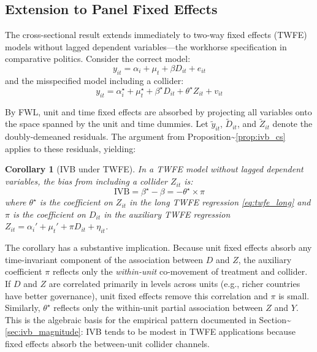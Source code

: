 \documentclass[
]{article}
\newtheorem{corollary}{Corollary}
\begin{document}
\subsection{\texorpdfstring{Extension to Panel Fixed Effects
\label{sec:twfe}}{Extension to Panel Fixed Effects }}\label{extension-to-panel-fixed-effects}

The cross-sectional result extends immediately to two-way fixed effects
(TWFE) models without lagged dependent variables---the workhorse
specification in comparative politics. Consider the correct model:
\begin{equation}
y_{it} = \alpha_i + \mu_t + \beta D_{it} + e_{it}
\label{eq:twfe_short}
\end{equation} and the misspecified model including a collider:
\begin{equation}
y_{it} = \alpha_i^{\star} + \mu_t^{\star} + \beta^{\star} D_{it} + \theta^{\star} Z_{it} + v_{it}
\label{eq:twfe_long}
\end{equation}

By FWL, unit and time fixed effects are absorbed by projecting all
variables onto the space spanned by the unit and time dummies. Let
\(\widetilde{y}_{it}\), \(\widetilde{D}_{it}\), and
\(\widetilde{Z}_{it}\) denote the doubly-demeaned residuals. The
argument from Proposition\textasciitilde{}\ref{prop:ivb_cs} applies to
these residuals, yielding:

\begin{corollary}[IVB under TWFE]
\label{cor:ivb_twfe}
In a TWFE model without lagged dependent variables, the bias from including a collider $Z_{it}$ is:
\begin{equation}
\text{IVB} = \beta^{\star} - \beta = -\theta^{\star} \times \pi
\label{eq:ivb_twfe}
\end{equation}
where $\theta^{\star}$ is the coefficient on $Z_{it}$ in the long TWFE regression \eqref{eq:twfe_long} and $\pi$ is the coefficient on $D_{it}$ in the auxiliary TWFE regression $Z_{it} = \alpha_i' + \mu_t' + \pi D_{it} + \eta_{it}$.
\end{corollary}

The corollary has a substantive implication. Because unit fixed effects
absorb any time-invariant component of the association between \(D\) and
\(Z\), the auxiliary coefficient \(\pi\) reflects only the
\textit{within-unit} co-movement of treatment and collider. If \(D\) and
\(Z\) are correlated primarily in levels across units (e.g., richer
countries have better governance), unit fixed effects remove this
correlation and \(\pi\) is small. Similarly, \(\theta^{\star}\) reflects
only the within-unit partial association between \(Z\) and \(Y\). This
is the algebraic basis for the empirical pattern documented in
Section\textasciitilde{}\ref{sec:ivb_magnitude}: IVB tends to be modest
in TWFE applications because fixed effects absorb the between-unit
collider channels.
\end{document}

